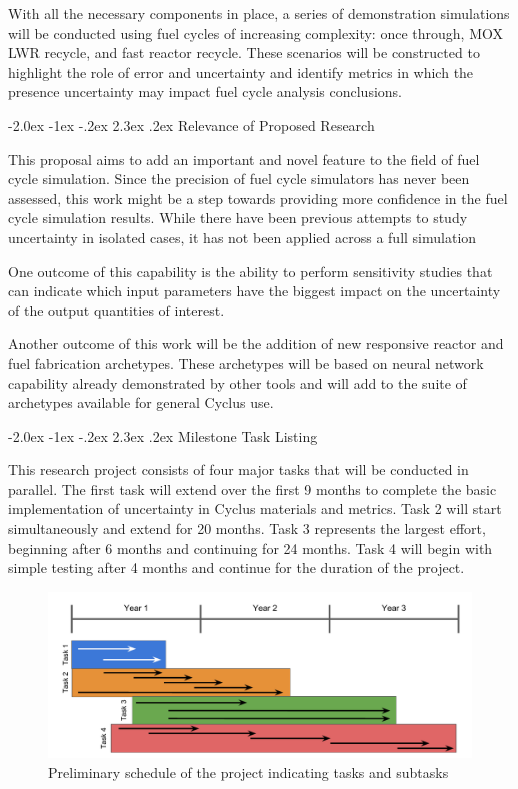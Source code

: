 \documentclass[dvips,11pt]{article}
\makeatletter
\renewcommand\section{\@startsection {section}{1}{\z@}%
                                   {-2.0ex \@plus -1ex \@minus -.2ex}%
                                   {2.3ex \@plus.2ex}%
                                   {\normalfont\bfseries}}%
\makeatother
\begin{document}
With all the necessary components in place, a
series of demonstration simulations will be
conducted using fuel cycles of increasing
complexity: once through, MOX LWR recycle, and
fast reactor recycle.  These scenarios will be
constructed to highlight the role of error and
uncertainty and identify metrics in which the
presence uncertainty may impact fuel cycle
analysis conclusions.

\section{Relevance of Proposed Research}

This proposal aims to add an important and novel
feature to the field of fuel cycle simulation.
Since the precision of fuel cycle simulators has
never been assessed, this work might be a step
towards providing more confidence in the fuel
cycle simulation results.  While there have been
previous attempts to study uncertainty in isolated
cases\cite{visionEcon}, it has not been applied
across a full simulation

One outcome of this capability is the ability to
perform sensitivity studies that can indicate
which input parameters have the biggest impact on
the uncertainty of the output quantities of
interest.

Another outcome of this work will be the addition
of new responsive reactor and fuel fabrication
archetypes.  These archetypes will be based on
neural network capability already demonstrated by
other tools and will add to the suite of
archetypes available for general Cyclus use.

\section{Milestone Task Listing}

This research project consists of four major tasks
that will be conducted in parallel.  The first
task will extend over the first 9 months to
complete the basic implementation of uncertainty
in Cyclus materials and metrics.  Task 2 will
start simultaneously and extend for 20 months.
Task 3 represents the largest effort, beginning
after 6 months and continuing for 24 months.  Task
4 will begin with simple testing after 4 months
and continue for the duration of the project.

\begin{figure}[h!]
\centering
\includegraphics[width=\textwidth]	{timeline}
\caption{Preliminary schedule of the project indicating tasks and subtasks}
\label{fig:progression}
\end{figure}
\end{document}
